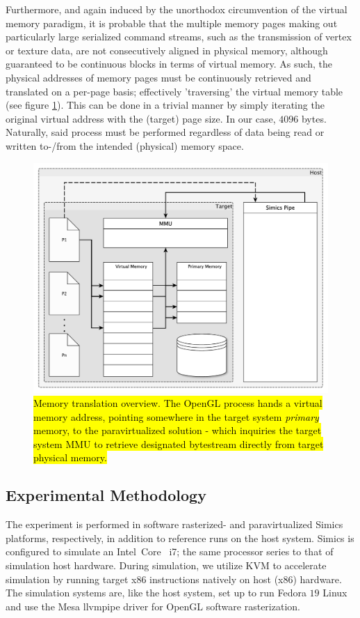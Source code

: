 Furthermore, and again induced by the unorthodox circumvention of the virtual memory paradigm, it is probable that the multiple memory pages making out particularly large serialized command streams, such as the transmission of vertex or texture data, are not consecutively aligned in physical memory, although guaranteed to be continuous blocks in terms of virtual memory.
As such, the physical addresses of memory pages must be continuously retrieved and translated on a per-page basis; effectively 'traversing' the virtual memory table (see figure \ref{fig:virtualmemory}).
This can be done in a trivial manner by simply iterating the original virtual address with the (target) page size.
In our case, $4096$ bytes.
Naturally, said process must be performed regardless of data being read or written to-/from the intended (physical) memory space.

\begin{figure}
\centering
\includegraphics[width=\linewidth]{img/yedvirtualmemory.pdf}
\caption[Memory translation overview]{\hl{Memory translation overview. The OpenGL process hands a virtual memory address, pointing somewhere in the target system \textit{primary} memory, to the paravirtualized solution - which inquiries the target system MMU to retrieve designated bytestream directly from target physical memory.}}
\label{fig:virtualmemory}
\end{figure}

\subsection{Experimental Methodology}
\label{sec:experimentalmethodology}
The experiment is performed in software rasterized- and paravirtualized Simics platforms, respectively, in addition to reference runs on the host system.
Simics is configured to simulate an Intel\circledR\ Core \texttrademark\ i7; the same processor series to that of simulation host hardware.
During simulation, we utilize KVM to accelerate simulation by running target x86 instructions natively on host (x86) hardware.
The simulation systems are, like the host system, set up to run Fedora $19$ Linux and use the Mesa llvmpipe driver for OpenGL software rasterization.

